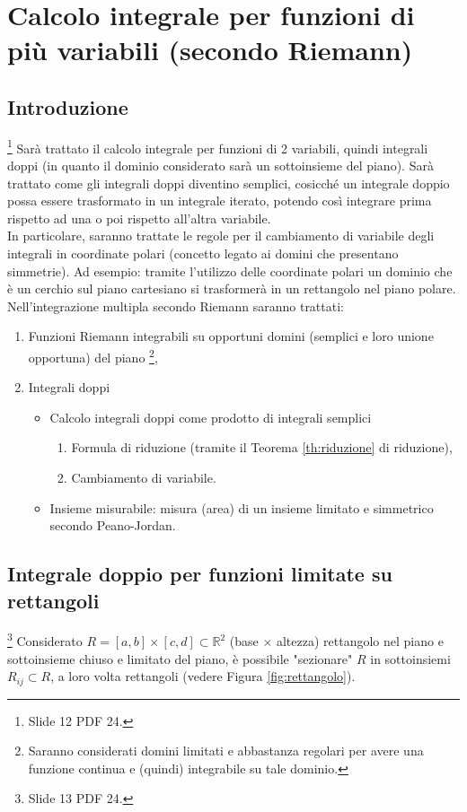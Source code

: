 \section{Calcolo integrale per funzioni di più variabili (secondo Riemann)}
\subsection{Introduzione}
\footnote{Slide 12 PDF 24.} Sarà trattato il calcolo integrale per funzioni di 2 variabili, quindi integrali doppi (in quanto il dominio considerato sarà un sottoinsieme del piano). Sarà trattato come gli integrali doppi diventino semplici, cosicché un integrale doppio possa essere trasformato in un integrale iterato, potendo così integrare prima rispetto ad una o poi rispetto all'altra variabile.\\
In particolare, saranno trattate le regole per il cambiamento di variabile degli integrali in coordinate polari (concetto legato ai domini che presentano simmetrie). Ad esempio: tramite l'utilizzo delle coordinate polari un dominio che è un cerchio sul piano cartesiano si trasformerà in un rettangolo nel piano polare.\\
Nell'integrazione multipla secondo Riemann saranno trattati:
\begin{enumerate}
	\item Funzioni Riemann integrabili su opportuni domini (semplici e loro unione opportuna) del piano \footnote{Saranno considerati domini limitati e abbastanza regolari per avere una funzione continua e (quindi) integrabile su tale dominio.},
	\item Integrali doppi
	\begin{itemize}
		\item Calcolo integrali doppi come prodotto di integrali semplici
		\begin{enumerate}
			\item Formula di riduzione (tramite il Teorema \ref{th:riduzione} di riduzione),
			\item Cambiamento di variabile.
		\end{enumerate}	
		\item Insieme misurabile: misura (area) di un insieme limitato e simmetrico secondo Peano-Jordan.
	\end{itemize}
\end{enumerate}

\subsection{Integrale doppio per funzioni limitate su rettangoli}
\footnote{Slide 13 PDF 24.}
Considerato $R=[a,b]\times[c,d]\subset \mathbb R^2$ (base $\times$ altezza) rettangolo nel piano e sottoinsieme chiuso e limitato del piano, è possibile "sezionare" $R$ in sottoinsiemi $R_{ij}\subset R$, a loro volta rettangoli (vedere Figura \ref{fig:rettangolo}).


